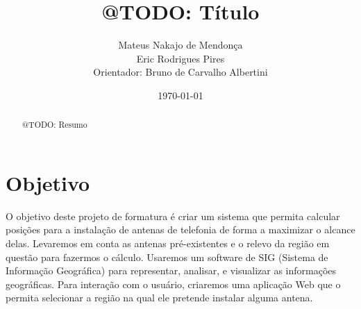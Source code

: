 \documentclass[a4paper, 11pt]{article}
\title{@TODO: Título}
\author{Mateus Nakajo de Mendonça  \\
	Eric Rodrigues Pires  \\
    Orientador: Bruno de Carvalho Albertini
	}
\date{\today}
\begin{document}
\maketitle

\begin{abstract}
@TODO: Resumo
\end{abstract}

\section{Objetivo}
O objetivo deste projeto de formatura é criar um sistema que permita calcular posições para a instalação de antenas de telefonia de forma a maximizar o alcance delas. Levaremos em conta as antenas pré-existentes e o relevo da região em questão para fazermos o cálculo. Usaremos um software de SIG (Sistema de Informação Geográfica) para representar, analisar, e visualizar as informações geográficas. Para interação com o usuário, criaremos uma aplicação Web que o permita selecionar a região na qual ele pretende instalar alguma antena.
\end{document}
